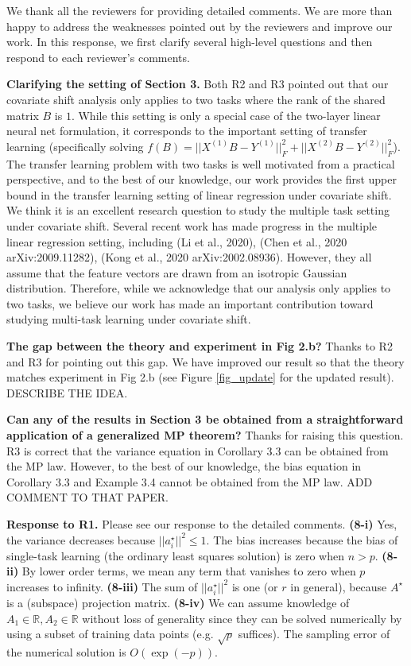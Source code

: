 \documentclass{article}
\begin{document}
	We thank all the reviewers for providing detailed comments.
	We are more than happy to address the weaknesses pointed out by the reviewers and improve our work.
	In this response, we first clarify several high-level questions and then respond to each reviewer's comments.

	\textbf{Clarifying the setting of Section 3.} Both R2 and R3 pointed out that our covariate shift analysis only applies to two tasks where the rank of the shared matrix $B$ is $1$.
	While this setting is only a special case of the two-layer linear neural net formulation, it corresponds to the important setting of transfer learning (specifically solving $f(B) = ||X^{(1)} B - Y^{(1)}||_F^2 + ||X^{(2)} B - Y^{(2)}||_F^2$).
	The transfer learning problem with two tasks is well motivated from a practical perspective, and to the best of our knowledge, our work provides the first upper bound in the transfer learning setting of linear regression under covariate shift.
	We think it is an excellent research question to study the multiple task setting under covariate shift.
	Several recent work has made progress in the multiple linear regression setting, including (Li et al., 2020), (Chen et al., 2020 arXiv:2009.11282), (Kong et al., 2020 arXiv:2002.08936).
	However, they all assume that the feature vectors are drawn from an isotropic Gaussian distribution.
	Therefore, while we acknowledge that our analysis only applies to two tasks, we believe our work has made an important contribution toward studying multi-task learning under covariate shift.

	\textbf{The gap between the theory and experiment in Fig 2.b?} Thanks to R2 and R3 for pointing out this gap.
	We have improved our result so that the theory matches experiment in Fig 2.b (see Figure \ref{fig_update} for the updated result).
	DESCRIBE THE IDEA.

	\textbf{Can any of the results in Section 3 be obtained from a straightforward application of a generalized MP theorem?}
	Thanks for raising this question. R3 is correct that the variance equation in Corollary 3.3 can be obtained from the MP law.
	However, to the best of our knowledge, the bias equation in Corollary 3.3 and Example 3.4 cannot be obtained from the MP law.
	ADD COMMENT TO THAT PAPER.

	\textbf{Response to R1.} Please see our response to the detailed comments.
	\textbf{(8-i)} Yes, the variance decreases because $||{a_i^{\star}}||^2 \le 1$.
	The bias increases because the bias of single-task learning (the ordinary least squares solution) is zero when $n > p$.
	\textbf{(8-ii)} By lower order terms, we mean any term that vanishes to zero when $p$ increases to infinity.
	\textbf{(8-iii)} The sum of $||{a_i^{\star}}||^2$ is one (or $r$ in general), because $A^{\star}$ is a (subspace) projection matrix.
	\textbf{(8-iv)} %
	We can assume knowledge of $A_1 \in \mathbb R, A_2 \in \mathbb R$ without loss of generality since they can be solved numerically by using a subset of training data points (e.g. $\sqrt{p}$ suffices).
	The sampling error of the numerical solution is $O(\exp(-p))$.
\end{document}
